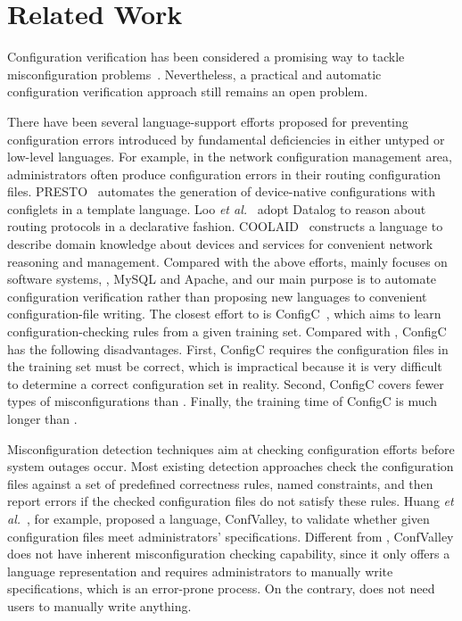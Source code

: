 
\section{Related Work}

Configuration verification has been considered a promising way  
to tackle misconfiguration problems~\cite{xu15systems}.
Nevertheless, a practical and automatic configuration
verification approach still remains an open problem.

There have been several language-support efforts proposed for preventing
configuration errors introduced by fundamental deficiencies in
either untyped or low-level languages. For example, in the network
configuration management area, administrators often
produce configuration errors in their routing configuration files.
PRESTO~\cite{enck07configuration} 
automates the generation of device-native configurations
with configlets in a template language. 
Loo {\em et al.}~\cite{loo05declarative} adopt Datalog to reason about 
routing protocols in a declarative fashion. 
COOLAID~\cite{chen10declarative} constructs
a language to describe domain knowledge about devices and
services for convenient network reasoning and management.
Compared with the above efforts, \app mainly focuses on software systems, 
\eg, MySQL and Apache, and our main purpose is to automate configuration
verification rather than proposing new languages 
to convenient configuration-file writing. 
The closest effort to \app is ConfigC~\cite{santolucitoCAV},
which aims to learn configuration-checking rules from a given training
set. Compared with \app, ConfigC has the following disadvantages.
First, ConfigC requires the configuration files in the training set must 
be correct, which is impractical because it is very difficult to
determine a correct configuration set in reality.
Second, ConfigC covers fewer types of misconfigurations than \app. 
Finally, the training time of ConfigC is much longer than \app.

Misconfiguration detection techniques aim at checking configuration
efforts before system outages occur.
Most existing detection approaches check 
the configuration files against a set of predefined correctness 
rules, named constraints, and then report errors if 
the checked configuration files do not satisfy these rules.
Huang {\em et al.}~\cite{huang15confvalley},
for example, proposed a 
language, ConfValley, to validate 
whether given configuration files meet administrators' specifications. 
Different from \app, ConfValley does not
have inherent misconfiguration checking capability, since it only offers
a language representation and requires administrators to
manually write specifications, which is an error-prone
process. On the contrary, \app does not need users to manually
write anything.

